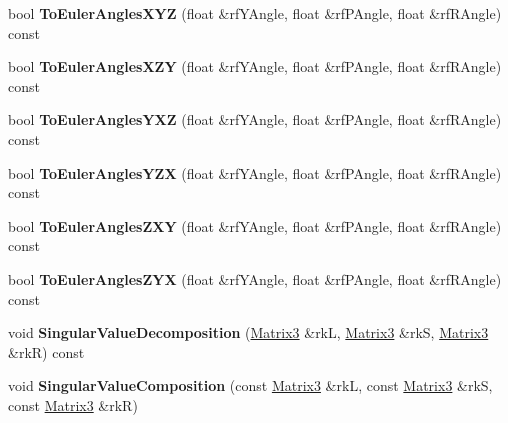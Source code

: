 \begin{DoxyCompactItemize}
\item 
bool {\bfseries To\+Euler\+Angles\+X\+YZ} (float \&rf\+Y\+Angle, float \&rf\+P\+Angle, float \&rf\+R\+Angle) const \hypertarget{class_i_dream_sky_1_1_matrix3_a3e2cc89f38d0509a97b73458ec9c7c80}{}\label{class_i_dream_sky_1_1_matrix3_a3e2cc89f38d0509a97b73458ec9c7c80}

\item 
bool {\bfseries To\+Euler\+Angles\+X\+ZY} (float \&rf\+Y\+Angle, float \&rf\+P\+Angle, float \&rf\+R\+Angle) const \hypertarget{class_i_dream_sky_1_1_matrix3_afce2231f029136578bc5953db2ed57b0}{}\label{class_i_dream_sky_1_1_matrix3_afce2231f029136578bc5953db2ed57b0}

\item 
bool {\bfseries To\+Euler\+Angles\+Y\+XZ} (float \&rf\+Y\+Angle, float \&rf\+P\+Angle, float \&rf\+R\+Angle) const \hypertarget{class_i_dream_sky_1_1_matrix3_aaeda9c614e975c4b35968d2a68da405b}{}\label{class_i_dream_sky_1_1_matrix3_aaeda9c614e975c4b35968d2a68da405b}

\item 
bool {\bfseries To\+Euler\+Angles\+Y\+ZX} (float \&rf\+Y\+Angle, float \&rf\+P\+Angle, float \&rf\+R\+Angle) const \hypertarget{class_i_dream_sky_1_1_matrix3_ac3a6dc0d29e550d6cbb87f78c767926b}{}\label{class_i_dream_sky_1_1_matrix3_ac3a6dc0d29e550d6cbb87f78c767926b}

\item 
bool {\bfseries To\+Euler\+Angles\+Z\+XY} (float \&rf\+Y\+Angle, float \&rf\+P\+Angle, float \&rf\+R\+Angle) const \hypertarget{class_i_dream_sky_1_1_matrix3_a1e1ad2b8530c01a5161f03e9f46abdf6}{}\label{class_i_dream_sky_1_1_matrix3_a1e1ad2b8530c01a5161f03e9f46abdf6}

\item 
bool {\bfseries To\+Euler\+Angles\+Z\+YX} (float \&rf\+Y\+Angle, float \&rf\+P\+Angle, float \&rf\+R\+Angle) const \hypertarget{class_i_dream_sky_1_1_matrix3_ac8ffed0a3b1ed974cb2c66359ea3ad14}{}\label{class_i_dream_sky_1_1_matrix3_ac8ffed0a3b1ed974cb2c66359ea3ad14}

\item 
void {\bfseries Singular\+Value\+Decomposition} (\hyperlink{class_i_dream_sky_1_1_matrix3}{Matrix3} \&rkL, \hyperlink{class_i_dream_sky_1_1_matrix3}{Matrix3} \&rkS, \hyperlink{class_i_dream_sky_1_1_matrix3}{Matrix3} \&rkR) const \hypertarget{class_i_dream_sky_1_1_matrix3_a27766a7a608878c262c53d2ab657bd1a}{}\label{class_i_dream_sky_1_1_matrix3_a27766a7a608878c262c53d2ab657bd1a}

\item 
void {\bfseries Singular\+Value\+Composition} (const \hyperlink{class_i_dream_sky_1_1_matrix3}{Matrix3} \&rkL, const \hyperlink{class_i_dream_sky_1_1_matrix3}{Matrix3} \&rkS, const \hyperlink{class_i_dream_sky_1_1_matrix3}{Matrix3} \&rkR)\hypertarget{class_i_dream_sky_1_1_matrix3_a170d42745dca514bf18af33cf493e603}{}\label{class_i_dream_sky_1_1_matrix3_a170d42745dca514bf18af33cf493e603}


\end{DoxyCompactItemize}
